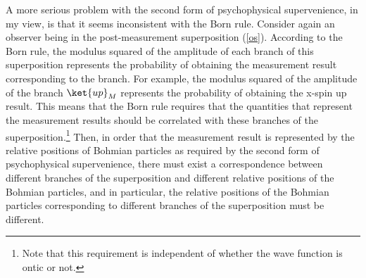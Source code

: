 
A more serious problem with the second form of psychophysical supervenience, in my view, is that it seems inconsistent with the Born rule. 
Consider again an observer being in the post-measurement superposition (\ref{os}).
According to the Born rule, the modulus squared of the amplitude of each branch of this superposition represents the probability of obtaining the measurement result corresponding to the branch.
For example, the modulus squared of the amplitude of the branch $\ket{up}_M$ represents the probability of obtaining the x-spin up result.
This means that the Born rule requires that the quantities that represent the measurement results should be correlated with these branches of the superposition.\footnote{Note that this requirement is independent of whether the wave function is ontic or not.}
Then, in order that the measurement result is represented by the relative positions of Bohmian particles as required by the second form of psychophysical supervenience, there must exist a correspondence between different branches of the superposition and different relative positions of the Bohmian particles, and in particular, the relative positions of the Bohmian particles corresponding to different branches of the superposition must be different.

